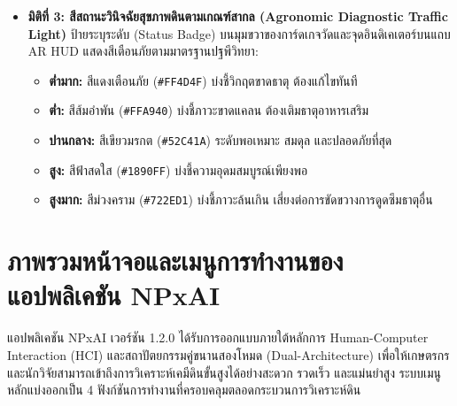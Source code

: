 \documentclass[12pt,a4paper,oneside]{book}
\begin{document}
\begin{enumerate}
\begin{itemize}
\begin{itemize}
        \end{itemize}
        \item \textbf{มิติที่ 3: สีสถานะวินิจฉัยสุขภาพดินตามเกณฑ์สากล (Agronomic Diagnostic Traffic Light)}
        ป้ายระบุระดับ (Status Badge) บนมุมขวาของการ์ดเกจวัดและจุดอินดิเคเตอร์บนแถบ AR HUD แสดงสีเตือนภัยตามมาตรฐานปฐพีวิทยา:
        \begin{itemize}
            \item \textbf{ต่ำมาก:} สีแดงเตือนภัย (\texttt{\#FF4D4F}) บ่งชี้วิกฤตขาดธาตุ ต้องแก้ไขทันที
            \item \textbf{ต่ำ:} สีส้มอำพัน (\texttt{\#FFA940}) บ่งชี้ภาวะขาดแคลน ต้องเติมธาตุอาหารเสริม
            \item \textbf{ปานกลาง:} สีเขียวมรกต (\texttt{\#52C41A}) ระดับพอเหมาะ สมดุล และปลอดภัยที่สุด
            \item \textbf{สูง:} สีฟ้าสดใส (\texttt{\#1890FF}) บ่งชี้ความอุดมสมบูรณ์เพียงพอ
            \item \textbf{สูงมาก:} สีม่วงคราม (\texttt{\#722ED1}) บ่งชี้ภาวะล้นเกิน เสี่ยงต่อการขัดขวางการดูดซึมธาตุอื่น
        \end{itemize}
    \end{itemize}
\end{enumerate}

\section{ภาพรวมหน้าจอและเมนูการทำงานของแอปพลิเคชัน NPxAI}
แอปพลิเคชัน NPxAI เวอร์ชัน 1.2.0 ได้รับการออกแบบภายใต้หลักการ Human-Computer Interaction (HCI) และสถาปัตยกรรมคู่ขนานสองโหมด (Dual-Architecture) เพื่อให้เกษตรกรและนักวิจัยสามารถเข้าถึงการวิเคราะห์เคมีดินขั้นสูงได้อย่างสะดวก รวดเร็ว และแม่นยำสูง ระบบเมนูหลักแบ่งออกเป็น 4 ฟังก์ชันการทำงานที่ครอบคลุมตลอดกระบวนการวิเคราะห์ดิน
\end{document}
